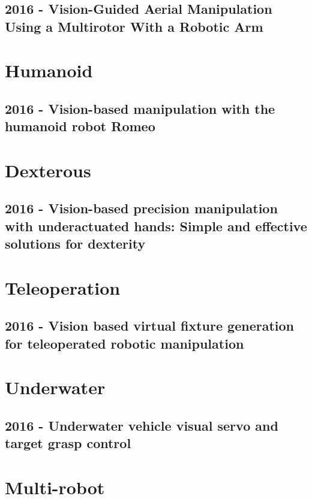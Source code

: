 \subsection{2016 - Vision-Guided Aerial Manipulation Using a Multirotor With a Robotic Arm}

\section{Humanoid} \label{humanoid}
\subsection{2016 - Vision-based manipulation with the humanoid robot Romeo}

\section{Dexterous}
\subsection{2016 - Vision-based precision manipulation with underactuated hands: Simple and effective solutions for dexterity}


\section{Teleoperation}
\subsection{2016 - Vision based virtual fixture generation for teleoperated robotic manipulation}


\section{Underwater}
\subsection{2016 - Underwater vehicle visual servo and target grasp control}


\section{Multi-robot}
